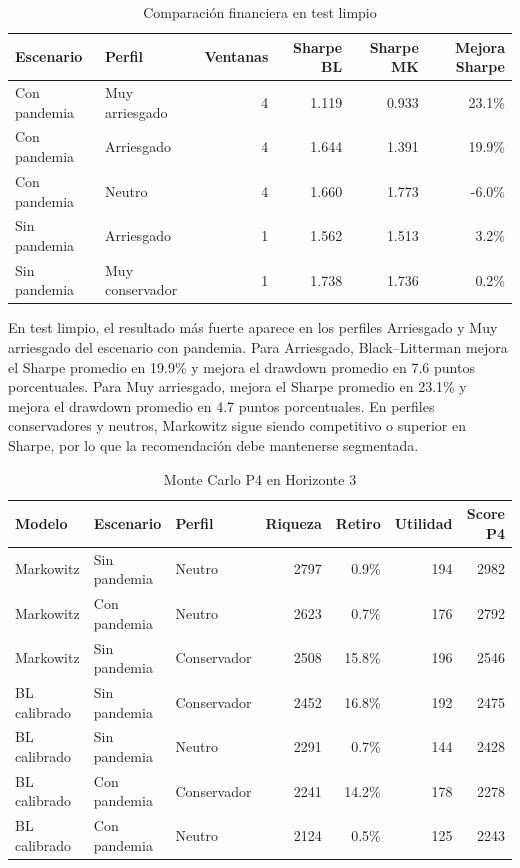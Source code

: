 \documentclass[11pt]{article}
\begin{document}
\begin{table}[H]
\centering
\caption{Comparaci\'on financiera en test limpio}
\label{tab:test}
\begin{tabular}{l l r r r r}
\toprule
Escenario & Perfil & Ventanas & Sharpe BL & Sharpe MK & Mejora Sharpe \\
\midrule
Con pandemia & Muy arriesgado & 4 & 1.119 & 0.933 & 23.1\% \\
Con pandemia & Arriesgado & 4 & 1.644 & 1.391 & 19.9\% \\
Con pandemia & Neutro & 4 & 1.660 & 1.773 & -6.0\% \\
Sin pandemia & Arriesgado & 1 & 1.562 & 1.513 & 3.2\% \\
Sin pandemia & Muy conservador & 1 & 1.738 & 1.736 & 0.2\% \\
\bottomrule
\end{tabular}
\end{table}

En test limpio, el resultado m\'as fuerte aparece en los perfiles Arriesgado y Muy arriesgado del escenario con pandemia. Para Arriesgado, Black--Litterman mejora el Sharpe promedio en 19.9\% y mejora el drawdown promedio en 7.6 puntos porcentuales. Para Muy arriesgado, mejora el Sharpe promedio en 23.1\% y mejora el drawdown promedio en 4.7 puntos porcentuales. En perfiles conservadores y neutros, Markowitz sigue siendo competitivo o superior en Sharpe, por lo que la recomendaci\'on debe mantenerse segmentada.

\begin{table}[H]
\centering
\caption{Monte Carlo P4 en Horizonte 3}
\label{tab:p4}
\begin{tabular}{l l l r r r r}
\toprule
Modelo & Escenario & Perfil & Riqueza & Retiro & Utilidad & Score P4 \\
\midrule
Markowitz & Sin pandemia & Neutro & 2797 & 0.9\% & 194 & 2982 \\
Markowitz & Con pandemia & Neutro & 2623 & 0.7\% & 176 & 2792 \\
Markowitz & Sin pandemia & Conservador & 2508 & 15.8\% & 196 & 2546 \\
BL calibrado & Sin pandemia & Conservador & 2452 & 16.8\% & 192 & 2475 \\
BL calibrado & Sin pandemia & Neutro & 2291 & 0.7\% & 144 & 2428 \\
BL calibrado & Con pandemia & Conservador & 2241 & 14.2\% & 178 & 2278 \\
BL calibrado & Con pandemia & Neutro & 2124 & 0.5\% & 125 & 2243 \\
\bottomrule
\end{tabular}
\end{table}
\end{document}
